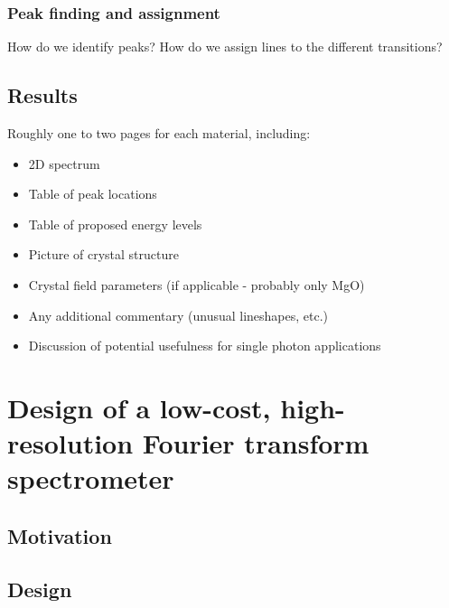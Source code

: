 \documentclass[12pt]{puthesis}
\begin{document}
\subsection{Peak finding and assignment}

How do we identify peaks? How do we assign lines to the different transitions?


\section{Results}

Roughly one to two pages for each material, including:

\begin{itemize}
\item 2D spectrum

\item Table of peak locations

\item Table of proposed energy levels

\item Picture of crystal structure

\item Crystal field parameters (if applicable - probably only MgO)

\item Any additional commentary (unusual lineshapes, etc.)

\item Discussion of potential usefulness for single photon applications 
\end{itemize}



\chapter{Design of a low-cost, high-resolution Fourier transform spectrometer}

\section{Motivation}



\section{Design}
\end{document}
